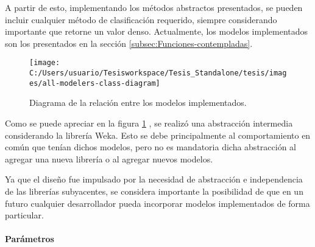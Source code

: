 A partir de esto, implementando los métodos abstractos presentados,
se pueden incluir cualquier método de clasificación requerido, siempre
considerando importante que retorne un valor denso. Actualmente, los
modelos implementados son los presentados en la sección \ref{subsec:Funciones-contempladas}.

\begin{figure}
\begin{centering}
\texttt{[image: C:/Users/usuario/Tesisworkspace/Tesis\_Standalone/tesis/images/all-modelers-class-diagram]}
\par\end{centering}

\caption{Diagrama de la relación entre los modelos implementados.\label{fig:all-modelers-class-diagram}}
\end{figure}


Como se puede apreciar en la figura \ref{fig:all-modelers-class-diagram}
, se realizó una abstracción intermedia considerando la librería Weka.
Esto se debe principalmente al comportamiento en común que tenían
dichos modelos, pero no es mandatoria dicha abstracción al agregar
una nueva librería o al agregar nuevos modelos. 

Ya que el diseño fue impulsado por la necesidad de abstracción e independencia
de las librerías subyacentes, se considera importante la posibilidad
de que en un futuro cualquier desarrollador pueda incorporar modelos
implementados de forma particular. 


\paragraph{Parámetros}

